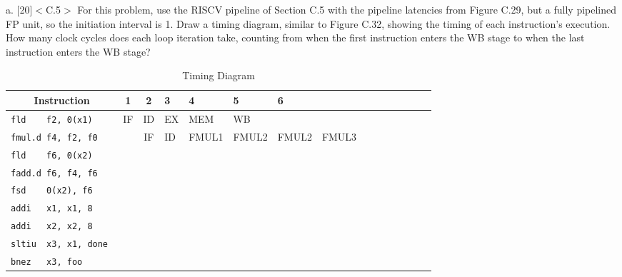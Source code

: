 \documentclass[11pt]{article}
\begin{document}
a. [20]$<$C.5$>$ For this problem, use the RISCV pipeline of Section C.5 with the pipeline latencies from Figure C.29, but a fully pipelined FP unit, so the initiation interval is 1. Draw a timing diagram, similar to Figure C.32, showing the timing of each instruction's execution. How many clock cycles does each loop iteration take, counting from when the first instruction enters the WB stage to when the last instruction enters the WB stage?

\begin{table}[ht]
\caption{Timing Diagram} %
\centering %
\begin{tabular}{c c c} %
\hline\hline %
Instruction & 1 & 2 & 3 & 4 & 5 & 6\\ %
\hline %
\verb|fld    f2, 0(x1)    | & IF & ID & EX & MEM   & WB    &       &       & &  & &  & &  & &\\
\verb|fmul.d f4, f2, f0   | &    & IF & ID & FMUL1 & FMUL2 & FMUL2 & FMUL3 & &  & &  & &  & &\\
\verb|fld    f6, 0(x2)    | &    &    &    &       &       &       &       & &  & &  & &  & &\\
\verb|fadd.d f6, f4, f6   | &    &    &    &       &       &       &       & &  & &  & &  & &\\
\verb|fsd    0(x2), f6    | &    &    &    &       &       &       &       & &  & &  & &  & &\\
\verb|addi   x1, x1, 8    | &    &    &    &       &       &       &       & &  & &  & &  & &\\
\verb|addi   x2, x2, 8    | &    &    &    &       &       &       &       & &  & &  & &  & &\\
\verb|sltiu  x3, x1, done | &    &    &    &       &       &       &       & &  & &  & &  & &\\
\verb|bnez   x3, foo      | &    &    &    &       &       &       &       & &  & &  & &  & &\\
[1ex] %
\hline %
\end{tabular}
\label{table:nonlin} %
\end{table}

\newpage
\end{document}
